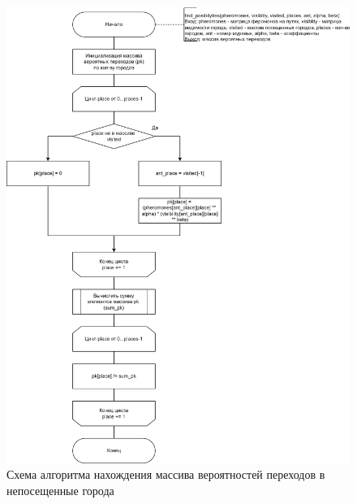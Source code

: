 \begin{figure}[h]
	\centering
	\includegraphics[height=0.9\textheight]{img/find-pos.png}
	\caption{Схема алгоритма нахождения массива вероятностей переходов в непосещенные города}
	\label{fig:find-pos}
\end{figure}

